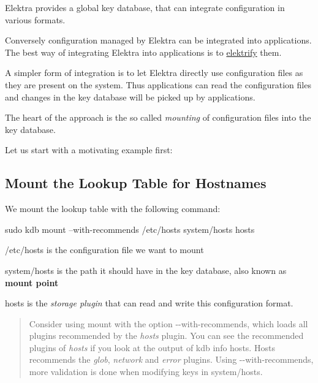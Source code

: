 Elektra provides a global key database, that can integrate configuration in various formats.

Conversely configuration managed by Elektra can be integrated into applications. The best way of integrating Elektra into applications is to \hyperlink{doc_help_elektra-glossary_md}{elektrify} them.

A simpler form of integration is to let Elektra directly use configuration files as they are present on the system. Thus applications can read the configuration files and changes in the key database will be picked up by applications.

The heart of the approach is the so called {\itshape mounting} of configuration files into the key database.

Let us start with a motivating example first\+:

\subsection*{Mount the Lookup Table for Hostnames}

We mount the lookup table with the following command\+:


\begin{DoxyCode}
sudo kdb mount --with-recommends /etc/hosts system/hosts hosts
\end{DoxyCode}



\begin{DoxyEnumerate}
\item {\ttfamily /etc/hosts} is the configuration file we want to mount
\item {\ttfamily system/hosts} is the path it should have in the key database, also known as {\bfseries mount point}
\item {\ttfamily hosts} is the {\itshape storage plugin} that can read and write this configuration format.
\end{DoxyEnumerate}

\begin{quote}
Consider using mount with the option {\ttfamily -\/-\/with-\/recommends}, which loads all plugins recommended by the {\itshape hosts} plugin. You can see the recommended plugins of {\itshape hosts} if you look at the output of {\ttfamily kdb info hosts}. Hosts recommends the {\itshape glob}, {\itshape network} and {\itshape error} plugins. Using {\ttfamily -\/-\/with-\/recommends}, more validation is done when modifying keys in {\ttfamily system/hosts}. \end{quote}


